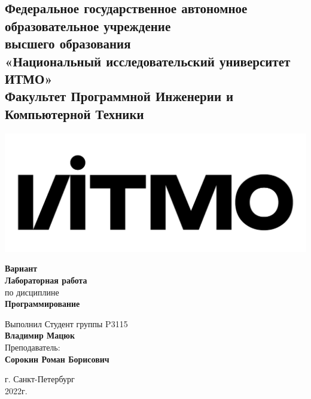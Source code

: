 \documentclass{article}
\begin{document}
\begin{center}
  \section*{
    Федеральное государственное автономное образовательное учреждение\\ высшего образования\\
    «Национальный исследовательский университет ИТМО»\\
    Факультет Программной Инженерии и Компьютерной Техники \\
   }
  \includegraphics[scale=0.2]{../../img/itmo.png}
\end{center}
\vspace{4cm}


\begin{center}
  \large \textbf{Вариант }\\
  \textbf{Лабораторная работа }\\
  по дисциплине\\
  \textbf{Программирование}
\end{center}

\vspace*{\fill}

\begin{flushright}
  Выполнил Студент группы P3115\\
  \textbf{Владимир Мацюк}\\
  Преподаватель: \\
  \textbf{Сорокин Роман Борисович}\\
\end{flushright}

\vspace{1cm}

\begin{center}
  г. Санкт-Петербург\\
  2022г.
\end{center}

\newpage
\end{document}
